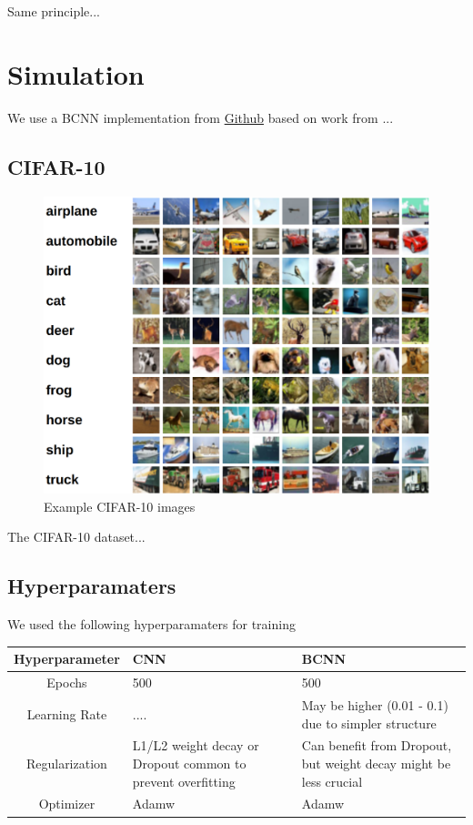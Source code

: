 \documentclass[12pt]{article}
\begin{document}
Same principle...

\section{Simulation}

We use a BCNN implementation from \href{https://github.com/kumar-shridhar/PyTorch-BayesianCNN}{Github} based on work from ... \cite{shridhar2019comprehensive} \cite{shridhar2018uncertainty}

\subsection{CIFAR-10}

	\begin{figure}[H]
		\centering
	\includegraphics[width=.75\textwidth]{../Images/cifar-10.png}
	\caption{Example CIFAR-10 images \cite{cifar10}}
\end{figure}

The CIFAR-10 dataset...


\subsection{Hyperparamaters}

We used the following hyperparamaters for training
	\begin{center}
		\begin{tabular}{|c||p{3cm}|p{3cm}|} %
			\hline
			\textbf{Hyperparameter} & \textbf{CNN} & \textbf{BCNN} \\ [0.5ex] 
			\hline\hline
			Epochs & 500 & 500\\
			\hline
			Learning Rate & ....  & May be higher (0.01 - 0.1) due to simpler structure  \\
			\hline
			Regularization & L1/L2 weight decay or Dropout common to prevent overfitting & Can benefit from Dropout, but weight decay might be less crucial \\
			\hline
			Optimizer & Adamw  & Adamw  \\
			\hline
		\end{tabular}
	\end{center}
	
\end{document}
